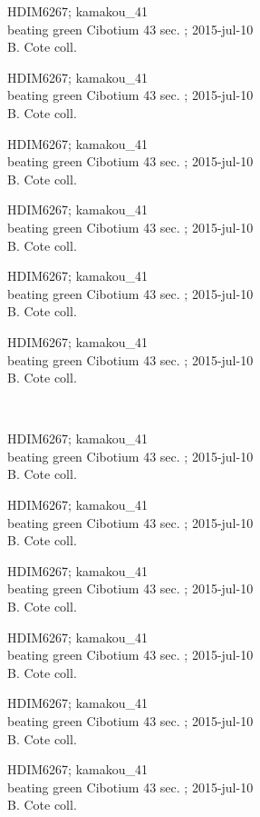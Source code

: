 \documentclass[2pt]{extarticle}
\begin{document}
\noindent
\raggedright
\parbox{0.16\textwidth}{\tiny \raggedright \rule[-0.3\baselineskip]{0pt}{10pt}HDIM6267; kamakou\_41\\ beating green Cibotium 43 sec. ; 2015-jul-10\\ B. Cote coll.}
\parbox{0.16\textwidth}{\tiny \raggedright \rule[-0.3\baselineskip]{0pt}{10pt}HDIM6267; kamakou\_41\\ beating green Cibotium 43 sec. ; 2015-jul-10\\ B. Cote coll.}
\parbox{0.16\textwidth}{\tiny \raggedright \rule[-0.3\baselineskip]{0pt}{10pt}HDIM6267; kamakou\_41\\ beating green Cibotium 43 sec. ; 2015-jul-10\\ B. Cote coll.}
\parbox{0.16\textwidth}{\tiny \raggedright \rule[-0.3\baselineskip]{0pt}{10pt}HDIM6267; kamakou\_41\\ beating green Cibotium 43 sec. ; 2015-jul-10\\ B. Cote coll.}
\parbox{0.16\textwidth}{\tiny \raggedright \rule[-0.3\baselineskip]{0pt}{10pt}HDIM6267; kamakou\_41\\ beating green Cibotium 43 sec. ; 2015-jul-10\\ B. Cote coll.}
\parbox{0.16\textwidth}{\tiny \raggedright \rule[-0.3\baselineskip]{0pt}{10pt}HDIM6267; kamakou\_41\\ beating green Cibotium 43 sec. ; 2015-jul-10\\ B. Cote coll.} \\ 
\vspace{0.001in} 

\noindent
\parbox{0.16\textwidth}{\tiny \raggedright \rule[-0.3\baselineskip]{0pt}{10pt}HDIM6267; kamakou\_41\\ beating green Cibotium 43 sec. ; 2015-jul-10\\ B. Cote coll.}
\parbox{0.16\textwidth}{\tiny \raggedright \rule[-0.3\baselineskip]{0pt}{10pt}HDIM6267; kamakou\_41\\ beating green Cibotium 43 sec. ; 2015-jul-10\\ B. Cote coll.}
\parbox{0.16\textwidth}{\tiny \raggedright \rule[-0.3\baselineskip]{0pt}{10pt}HDIM6267; kamakou\_41\\ beating green Cibotium 43 sec. ; 2015-jul-10\\ B. Cote coll.}
\parbox{0.16\textwidth}{\tiny \raggedright \rule[-0.3\baselineskip]{0pt}{10pt}HDIM6267; kamakou\_41\\ beating green Cibotium 43 sec. ; 2015-jul-10\\ B. Cote coll.}
\parbox{0.16\textwidth}{\tiny \raggedright \rule[-0.3\baselineskip]{0pt}{10pt}HDIM6267; kamakou\_41\\ beating green Cibotium 43 sec. ; 2015-jul-10\\ B. Cote coll.}
\parbox{0.16\textwidth}{\tiny \raggedright \rule[-0.3\baselineskip]{0pt}{10pt}HDIM6267; kamakou\_41\\ beating green Cibotium 43 sec. ; 2015-jul-10\\ B. Cote coll.} \\ 
\vspace{0.001in} 
\end{document}
